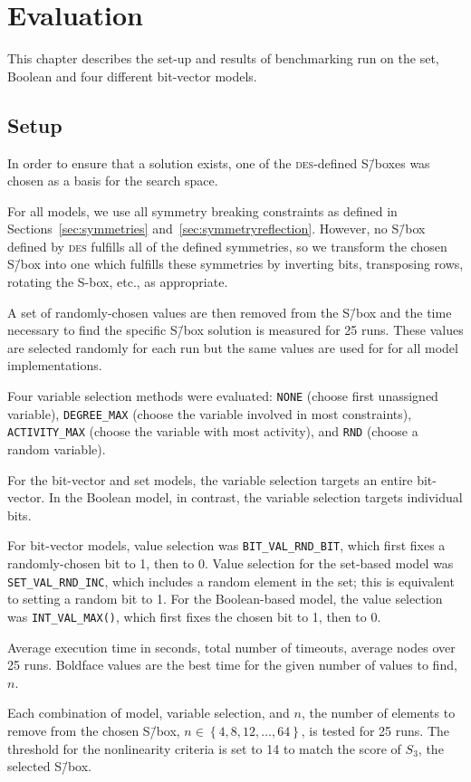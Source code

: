 \documentclass[a4paper,10pt,twoside,openright]{book}
\renewcommand{\sc}[1]{\textsc{\lowercase{#1}}}
\newcommand{\set}[1]{\left\{#1\right\}}
\newcommand*\cd[1]{\texttt{#1}}
\begin{document}
\chapter{Evaluation}
\label{sec:results}

This chapter describes the set-up and results of benchmarking run on the 
set, Boolean and four different bit-vector models.

\section{Setup}

In order to ensure that a solution exists, one of the \sc{DES}-defined 
S\=/boxes was chosen as a basis for the search space. 

For all models, we use all symmetry breaking constraints as defined in
Sections~\ref{sec:symmetries} and~\ref{sec:symmetryreflection}.
However, no S\=/box defined by \sc{DES} fulfills all of the defined symmetries,
so we transform the chosen S\=/box into one which fulfills these symmetries
by inverting bits, transposing rows, rotating the S-box, etc., as appropriate.

A set of randomly-chosen values are then removed from the S\=/box and the 
time necessary to find the specific S\=/box solution
is measured for 25 runs.
These values are selected randomly for each run but the same values are used 
for for all model implementations.

Four variable selection methods were evaluated: \cd{NONE} (choose first unassigned variable), \cd{DEGREE_MAX} (choose the variable involved in most constraints), \cd{ACTIVITY_MAX} (choose the variable with most activity), and \cd{RND} (choose a random variable).

For the bit-vector and set models, the variable selection targets an entire bit-vector. 
In the Boolean model, in contrast, the variable selection targets individual bits.

For bit-vector models, value selection was \cd{BIT_VAL_RND_BIT}, which first fixes a randomly-chosen bit to 1, then to 0.
Value selection for the set-based model was \cd{SET_VAL_RND_INC}, which includes a random element in the set; this is equivalent to setting a random bit to 1. 
For the Boolean-based model, the value selection was \cd{INT_VAL_MAX()}, which first fixes the chosen bit to 1, then to 0.
\begin{table}[H]
    \centering
    \sffamily
    \robustify\bfseries%
    \setlength{\tabcolsep}{4pt}
    \small
    
    \caption[Experimental results]{
        Average execution time in seconds, total number of timeouts, average nodes over 25 runs.
        Boldface values are the best time for the given number of values to find, $n$.}
    \label{tab:resultsall}
\end{table}
Each combination of model, variable selection, and $n$, the number of elements to remove from the chosen S\=/box, 
$n \in \set{4,8,12,\ldots,64}$,
is tested for 25 runs.
The threshold for the nonlinearity criteria is set to 14 to match the score of $S_3$, the selected S\=/box.
\end{document}
